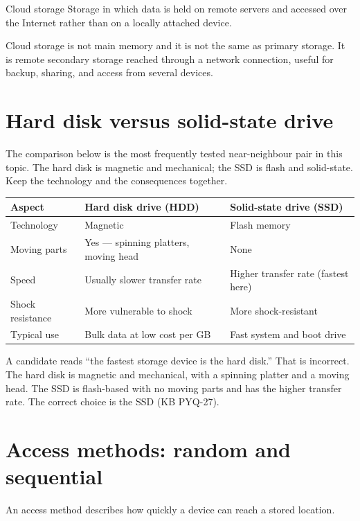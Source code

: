 \begin{definitionbox}{Cloud storage}
Storage in which data is held on remote servers and accessed over the
Internet rather than on a locally attached device.
\end{definitionbox}

Cloud storage is not main memory and it is not the same as primary storage.
It is remote secondary storage reached through a network connection, useful
for backup, sharing, and access from several devices.

\section{Hard disk versus solid-state drive}
The comparison below is the most frequently tested near-neighbour pair in this
topic. The hard disk is magnetic and mechanical; the SSD is flash and
solid-state. Keep the technology and the consequences together.

\begin{center}
\begin{tabular}{p{}p{}p{}}
\toprule
\textbf{Aspect} & \textbf{Hard disk drive (HDD)} & \textbf{Solid-state drive (SSD)}\\
\midrule
Technology & Magnetic & Flash memory\\
Moving parts & Yes --- spinning platters, moving head & None\\
Speed & Usually slower transfer rate & Higher transfer rate (fastest here)\\
Shock resistance & More vulnerable to shock & More shock-resistant\\
Typical use & Bulk data at low cost per GB & Fast system and boot drive\\
\bottomrule
\end{tabular}
\end{center}

\begin{example}
A candidate reads ``the fastest storage device is the hard disk.'' That is
incorrect. The hard disk is magnetic and mechanical, with a spinning platter
and a moving head. The SSD is flash-based with no moving parts and has the
higher transfer rate. The correct choice is the SSD (KB PYQ-27).
\end{example}

\section{Access methods: random and sequential}
An access method describes how quickly a device can reach a stored location.

